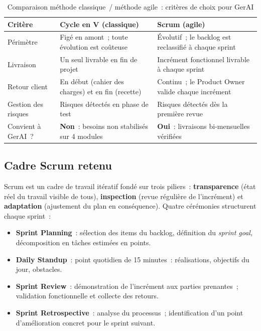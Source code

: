 \begin{table}[H]
\centering
\caption{Comparaison méthode classique~/ méthode agile~: critères de choix pour GerAI}
\label{tab:methodo}
\begin{tabularx}{\textwidth}{|l|L|L|}
\hline
{}\textbf{Critère} &
  \textbf{Cycle en V (classique)} & \textbf{Scrum (agile)} \\\hline
{}
Périmètre & Figé en amont~; toute évolution est coûteuse &
  Évolutif~; le backlog est reclassifié à chaque sprint \\\hline
Livraison & Un seul livrable en fin de projet &
  Incrément fonctionnel livrable à chaque sprint \\\hline
{}
Retour client & En début (cahier des charges) et en fin (recette) &
  Continu~; le Product Owner valide chaque incrément \\\hline
Gestion des risques & Risques détectés en phase de test &
  Risques détectés dès la première revue \\\hline
{}
Convient à GerAI~? &
  \textbf{Non}~: besoins non stabilisés sur 4 modules &
  \textbf{Oui}~: livraisons bi-mensuelles vérifiées \\\hline
\end{tabularx}
\end{table}

\subsection{Cadre Scrum retenu}

Scrum est un cadre de travail itératif fondé sur trois piliers~:
\textbf{transparence} (état réel du travail visible de tous),
\textbf{inspection} (revue régulière de l'incrément) et
\textbf{adaptation} (ajustement du plan en conséquence). Quatre cérémonies
structurent chaque sprint~:

\begin{itemize}
  \item \textbf{Sprint Planning}~: sélection des items du backlog, définition
        du \textit{sprint goal}, décomposition en tâches estimées en points.
  \item \textbf{Daily Standup}~: point quotidien de 15 minutes~: réalisations,
        objectifs du jour, obstacles.
  \item \textbf{Sprint Review}~: démonstration de l'incrément aux parties
        prenantes~; validation fonctionnelle et collecte des retours.
  \item \textbf{Sprint Retrospective}~: analyse du processus~; identification
        d'un point d'amélioration concret pour le sprint suivant.
\end{itemize}

